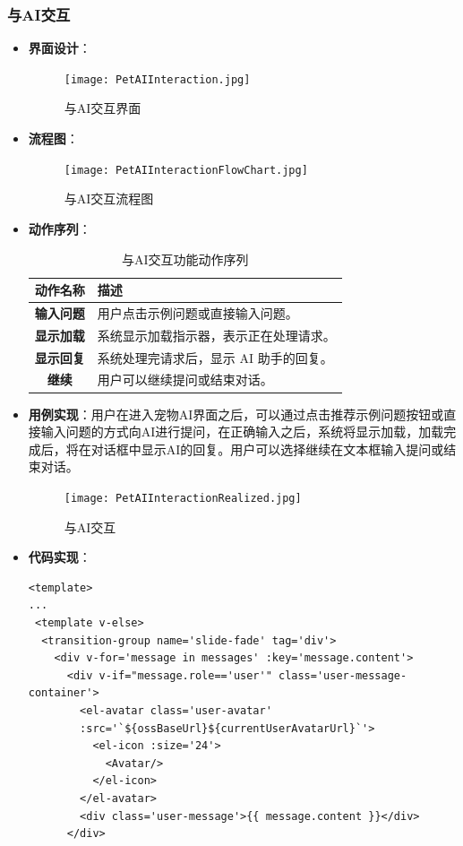 \subsubsection{与AI交互}
\begin{itemize}
	\item \textbf{界面设计}：
	\begin{figure}[H]
		\centering
		\texttt{[image: PetAIInteraction.jpg]}
		\caption{与AI交互界面}
		\label{PetAIInteraction}
	\end{figure}
	\item \textbf{流程图}：
	\begin{figure}[H]
		\centering
		\texttt{[image: PetAIInteractionFlowChart.jpg]}
		\caption{与AI交互流程图}
		\label{PetAIInteractionFlowChart}
	\end{figure}
	\item \textbf{动作序列}：
	\begin{table}[H]
		\centering
		\caption{与AI交互功能动作序列}
		\renewcommand\arraystretch{1.5}
		\begin{tabular}{|c|>{\raggedright\arraybackslash}p{10cm}|}
			\hline
			\textbf{动作名称} & \textbf{描述} \\ \hline
			\textbf{输入问题} & 用户点击示例问题或直接输入问题。  \\ \hline
			\textbf{显示加载} & 系统显示加载指示器，表示正在处理请求。 \\ \hline
			\textbf{显示回复} & 系统处理完请求后，显示 AI 助手的回复。 \\ \hline
			\textbf{继续} & 用户可以继续提问或结束对话。 \\ \hline
		\end{tabular}
	\end{table}
	\item \textbf{用例实现}：用户在进入宠物AI界面之后，可以通过点击推荐示例问题按钮或直接输入问题的方式向AI进行提问，在正确输入之后，系统将显示加载，加载完成后，将在对话框中显示AI的回复。用户可以选择继续在文本框输入提问或结束对话。
	\begin{figure}[H]
		\centering
		\texttt{[image: PetAIInteractionRealized.jpg]}
		\caption{与AI交互}
		\label{PetAIInteractionRealized}
	\end{figure}
	\item \textbf{代码实现}：
	\begin{verbatim}
<template>
...
 <template v-else>
  <transition-group name='slide-fade' tag='div'>
    <div v-for='message in messages' :key='message.content'>
      <div v-if="message.role=='user'" class='user-message-container'>
        <el-avatar class='user-avatar' 
        :src='`${ossBaseUrl}${currentUserAvatarUrl}`'>
          <el-icon :size='24'>
            <Avatar/>
          </el-icon>
        </el-avatar>
        <div class='user-message'>{{ message.content }}</div>
      </div>
	

\end{verbatim}
\end{itemize}
